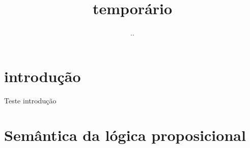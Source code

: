 \documentclass{article}
\title{temporário}
\author{..}
\begin{document}
\maketitle

\section{introdução}

Teste introdução

\section{Semântica da lógica proposicional}
\end{document}
